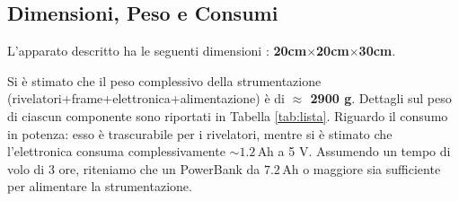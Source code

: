 \subsection{Dimensioni, Peso e Consumi}
L'apparato descritto ha le seguenti dimensioni : \textbf{20cm$\times$20cm$\times$30cm}.

Si è stimato che il peso complessivo della strumentazione (rivelatori+frame+elettronica+alimentazione) è di \textbf{$\approx$ 2900 g}. Dettagli sul peso di ciascun componente sono riportati in Tabella \ref{tab:lista}. Riguardo il consumo in potenza: esso è trascurabile per i rivelatori, mentre si è stimato che l'elettronica consuma complessivamente $\sim 1.2\,\text{Ah}$ a 5 V. Assumendo un tempo di volo di 3 ore, riteniamo che un PowerBank da $7.2\,\text{Ah}$ o maggiore sia sufficiente per alimentare la strumentazione.
